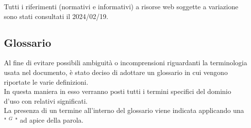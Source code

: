 Tutti i riferimenti (normativi e informativi) a risorse web soggette a variazione sono stati consultati il 2024/02/19.

\subsection{Glossario}

    Al fine di evitare possibili ambiguità o incomprensioni riguardanti la terminologia usata nel documento, è stato deciso di adottare un glossario in cui vengono riportate le varie definizioni.  \\
    In questa maniera in esso verranno posti tutti i termini specifici del dominio d’uso con relativi significati. \\
    La presenza di un termine all’interno del glossario viene indicata applicando una " $^{G}$ " ad apice della parola.
